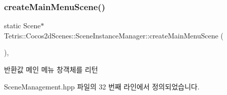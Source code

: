 \subsubsection{\texorpdfstring{create\+Main\+Menu\+Scene()}{createMainMenuScene()}}
{\footnotesize\ttfamily static Scene$\ast$ Tetris\+::\+Cocos2d\+Scenes\+::\+Scene\+Instance\+Manager\+::create\+Main\+Menu\+Scene (\begin{DoxyParamCaption}{ }\end{DoxyParamCaption})\hspace{0.3cm}{\ttfamily [inline]}, {\ttfamily [static]}}

\begin{DoxyReturn}{반환값}
메인 메뉴 창객체를 리턴 
\end{DoxyReturn}


Scene\+Management.\+hpp 파일의 32 번째 라인에서 정의되었습니다.


